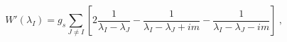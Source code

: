 \begin{equation}
  \label{eq:mmeom}
W'(\lambda_I) = g_s \sum_{J\neq I}\left[ 
2\frac1{\lambda_I-\lambda_J}
-\frac1{\lambda_I-\lambda_J+ im}
-\frac1{\lambda_I-\lambda_J- im}\right]\ ,
\end{equation}

